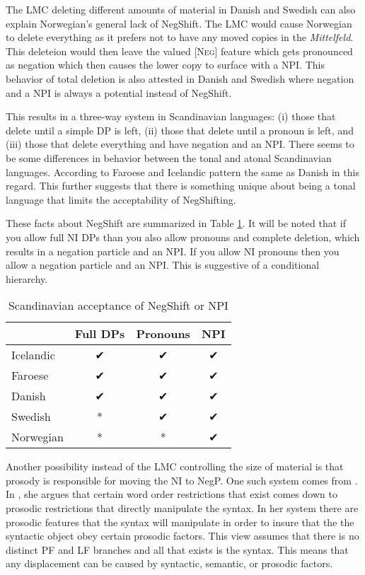 \documentclass[12pt, letterpaper]{article}
\begin{document}
The LMC deleting different amounts of material in Danish and Swedish can also explain Norwegian's general lack of NegShift. The LMC would cause Norwegian to delete everything as it prefers not to have any moved copies in the \emph{Mittelfeld}. This deleteion would then leave the valued [\textsc{Neg}] feature which gets pronounced as negation which then causes the lower copy to surface with a NPI. This behavior of total deletion is also attested in Danish and Swedish where negation and a NPI is always a potential instead of NegShift.

This results in a three-way system in Scandinavian languages: (i) those that delete until a simple DP is left, (ii) those that delete until a pronoun is left, and (iii) those that delete everything and have negation and an NPI. There seems to be some differences in behavior between the tonal and atonal Scandinavian languages. According to \citet{thrainssonFaroeseOverviewReference2004,thrainssonSyntaxIcelandic2010} Faroese and Icelandic pattern the same as Danish in this regard. This further suggests that there is something unique about being a tonal language that limits the acceptability of NegShifting. 

These facts about NegShift are summarized in Table \ref{tab:Paradigm}. It will be noted that if you allow full NI DPs than you also allow pronouns and complete deletion, which results in a negation particle and an NPI. If you allow NI pronouns then you allow a negation particle and an NPI. This is suggestive of a conditional hierarchy. 

\begin{table}[!hb]
	\centering
	\caption{Scandinavian acceptance of NegShift or NPI}
	\label{tab:Paradigm}
\begin{tabular}{lccc}
	\hline 
	& Full DPs & Pronouns & NPI\\
	\hline
	Icelandic & ✔︎ & ✔︎ & ✔︎ \\
	Faroese & ✔︎ & ✔︎ & ✔︎ \\
	Danish & ✔︎ & ✔︎ & ✔︎ \\
	Swedish & * & ✔︎ & ✔︎ \\
	Norwegian & * & * & ✔︎ \\
	\hline 
\end{tabular} 
\end{table}

Another possibility instead of the LMC controlling the size of material is that prosody is responsible for moving the NI to NegP. One such system comes from \citet{zubizarretaProsodyFocusWord1998}. In \citet{zubizarretaProsodyFocusWord1998}, she argues that certain word order restrictions that exist comes down to prosodic restrictions that directly manipulate the syntax. In her system there are prosodic features that the syntax will manipulate in order to insure that the the syntactic object obey certain prosodic factors. This view assumes that there is no distinct PF and LF branches and all that exists is the syntax. This means that any displacement can be caused by syntactic, semantic, or prosodic factors. 
\end{document}
